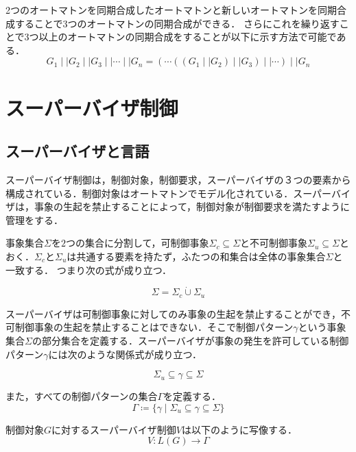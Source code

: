 2つのオートマトンを同期合成したオートマトンと新しいオートマトンを同期合成することで3つのオートマトンの同期合成ができる．
さらにこれを繰り返すことで3つ以上のオートマトンの同期合成をすることが以下に示す方法で可能である．
\begin{equation}
    G_1\mid\mid G_2\mid\mid G_3\mid\mid\cdots\mid\mid G_n=(\cdots((G_1\mid\mid G_2)\mid\mid G_3)\mid\mid\cdots)\mid\mid G_n
\end{equation}


\section{スーパーバイザ制御}

\subsection{スーパーバイザと言語}

スーパーバイザ制御は，制御対象，制御要求，スーパーバイザの３つの要素から構成されている．制御対象はオートマトンでモデル化されている．スーパーバイザは，事象の生起を禁止することによって，制御対象が制御要求を満たすように管理をする．

事象集合$\Sigma$を$2$つの集合に分割して，可制御事象$\Sigma_c \subseteq \Sigma$と不可制御事象$\Sigma_u \subseteq \Sigma$とおく．$\Sigma_c$と$\Sigma_u$は共通する要素を持たず，ふたつの和集合は全体の事象集合$\Sigma$と一致する． つまり次の式が成り立つ．

\begin{equation}
    \Sigma = \Sigma_c \dot{\cup} \Sigma_u
\end{equation}

スーパーバイザは可制御事象に対してのみ事象の生起を禁止することができ，不可制御事象の生起を禁止することはできない．そこで制御パターン$\gamma$という事象集合$\Sigma$の部分集合を定義する．スーパーバイザが事象の発生を許可している制御パターン$\gamma$には次のような関係式が成り立つ．

\begin{equation}
    \Sigma_u \subseteq \gamma \subseteq \Sigma
\end{equation}

また，すべての制御パターンの集合$\Gamma$を定義する．
\begin{equation}
    \Gamma \coloneqq \{\gamma \mid \Sigma_u \subseteq \gamma \subseteq \Sigma\}
\end{equation}

制御対象$G$に対するスーパーバイザ制御$V$は以下のように写像する．
\begin{equation}
    V \colon L(G) \rightarrow \Gamma
\end{equation}

